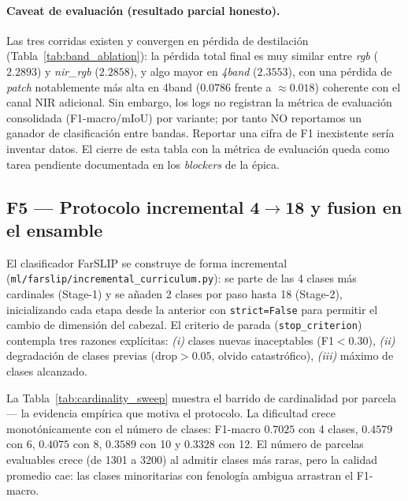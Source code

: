 

\paragraph{Caveat de evaluación (resultado parcial honesto).}
Las tres corridas existen y convergen en pérdida de destilación
(Tabla~\ref{tab:band_ablation}): la pérdida total final es muy similar entre
\textit{rgb} ($2.2893$) y \textit{nir\_rgb} ($2.2858$), y algo mayor en
\textit{4band} ($2.3553$), con una pérdida de \textit{patch} notablemente más
alta en 4band ($0.0786$ frente a $\approx0.018$) coherente con el canal NIR
adicional. Sin embargo, los logs no registran la métrica de evaluación
consolidada (F1-macro/mIoU) por variante; por tanto NO reportamos un ganador de
clasificación entre bandas. Reportar una cifra de F1 inexistente sería inventar
datos. El cierre de esta tabla con la métrica de evaluación queda como tarea
pendiente documentada en los \textit{blockers} de la épica.

\subsection{F5 --- Protocolo incremental 4$\rightarrow$18 y fusion en el ensamble}
\label{sec:farslip_f5}

El clasificador FarSLIP se construye de forma incremental
(\texttt{ml/farslip/incremental\_curriculum.py}): se parte de las 4 clases más
cardinales (Stage-1) y se añaden 2 clases por paso hasta 18 (Stage-2), inicializando
cada etapa desde la anterior con \texttt{strict=False} para permitir el cambio de
dimensión del cabezal. El criterio de parada (\texttt{stop\_criterion}) contempla
tres razones explícitas: \textit{(i)} clases nuevas inaceptables
(F1$<0.30$), \textit{(ii)} degradación de clases previas
($\text{drop}>0.05$, olvido catastrófico), \textit{(iii)} máximo de clases
alcanzado.

La Tabla~\ref{tab:cardinality_sweep} muestra el barrido de cardinalidad por
parcela --- la evidencia empírica que motiva el protocolo. La dificultad crece
monotónicamente con el número de clases: F1-macro $0.7025$ con 4 clases,
$0.4579$ con 6, $0.4075$ con 8, $0.3589$ con 10 y $0.3328$ con 12. El número de
parcelas evaluables crece (de 1301 a 3200) al admitir clases más raras, pero la
calidad promedio cae: las clases minoritarias con fenología ambigua arrastran el
F1-macro.

